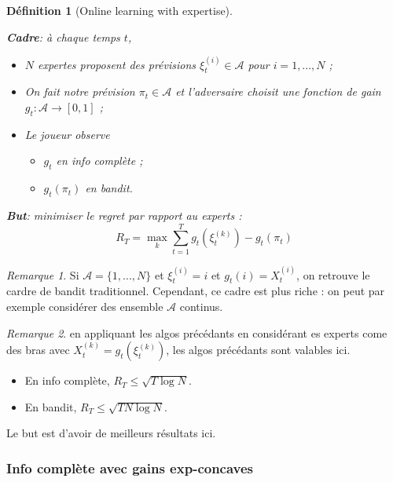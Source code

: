 \documentclass{article}
\newtheorem{definition}{Définition}[section]
\theoremstyle{remark}
\theoremstyle{remark}
\newtheorem{remark}{Remarque}[section]
\begin{document}
\begin{definition}[Online learning with expertise]
   $\quad$ %

   \textbf{Cadre}: à chaque temps $t$,
   \begin{itemize}
      \item $N$ expertes proposent des prévisions $\xi_t^{(i)} \in \mathcal{A}$ pour $i = 1,...,N$ ;
      \item On fait notre prévision $\pi_t \in \mathcal{A}$ et l'adversaire choisit une fonction de gain $g_t : \mathcal{A} \rightarrow [0,1]$ ;
      \item Le joueur observe
      \begin{itemize}
         \item $g_t$ en info complète ;
         \item $g_t(\pi_t)$ en bandit.
      \end{itemize}
   \end{itemize}

   \textbf{But}: minimiser le regret par rapport au experts :
   $$
   R_T = \max_k \sum_{t=1}^T g_t(\xi_t^{(k)}) - g_t(\pi_t)
   $$
\end{definition}

\begin{remark}
   Si $\mathcal{A} = \{1,...,N\}$ et $\xi_t^{(i)} = i$ et $g_t(i) = X_t^{(i)}$, on retrouve le cardre de bandit traditionnel. Cependant, ce cadre est plus riche : on peut par exemple considérer des ensemble $\mathcal{A}$ continus.
\end{remark}

\begin{remark}
   en appliquant les algos précédants en considérant es experts come des bras avec $X_t^{(k)} = g_t(\xi_t^{(k)})$, les algos précédants sont valables ici.

   \begin{itemize}
      \item En info complète, $R_T \leq \sqrt{T \log N}$.
      \item En bandit, $R_T \leq \sqrt{T N \log N}$.
   \end{itemize}

   Le but est d'avoir de meilleurs résultats ici.
\end{remark}

\subsubsection{Info complète avec gains exp-concaves}
\end{document}
